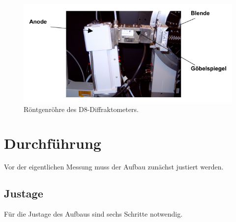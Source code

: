\begin{figure}
    \centering
    \includegraphics[scale=0.4]{content/rontgen.png}
    \caption{Röntgenröhre des D8-Diffraktometers.\cite{Anleitungalt}}
    \label{fig:rontgen}
\end{figure} 

\section{Durchführung}

Vor der eigentlichen Messung muss der Aufbau zunächst justiert werden. 

\subsection{Justage}

Für die Justage des Aufbaus sind sechs Schritte notwendig. 

